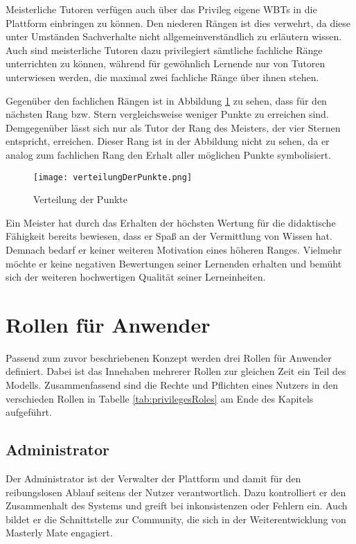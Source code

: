 Meisterliche Tutoren verfügen auch über das Privileg eigene WBTs in die
Plattform einbringen zu können. Den niederen Rängen ist dies verwehrt, da diese
unter Umständen Sachverhalte nicht allgemeinverständlich zu erläutern wissen.
Auch sind meisterliche Tutoren dazu privilegiert sämtliche fachliche Ränge
unterrichten zu können, während für gewöhnlich Lernende nur von Tutoren
unterwiesen werden, die maximal zwei fachliche Ränge über ihnen stehen.

Gegenüber den fachlichen Rängen ist in Abbildung \ref{ref:vertPunkt} zu sehen,
dass für den nächsten Rang bzw. Stern vergleichsweise weniger Punkte zu
erreichen sind. Demgegenüber lässt sich nur als Tutor der Rang des Meisters, der
vier Sternen entspricht, erreichen. Dieser Rang ist in der Abbildung nicht zu
sehen, da er analog zum fachlichen Rang den Erhalt aller möglichen Punkte
symbolisiert.
\begin{figure}[H] \texttt{[image: verteilungDerPunkte.png]}
\caption{Verteilung der Punkte}\label{ref:vertPunkt}
\end{figure}
Ein Meister hat durch das Erhalten der höchsten Wertung für die didaktische
Fähigkeit bereits bewiesen, dass er Spaß an der Vermittlung von Wissen hat.
Demnach bedarf er keiner weiteren Motivation eines höheren Ranges.
Vielmehr möchte er keine negativen Bewertungen seiner Lernenden erhalten und
bemüht sich der weiteren hochwertigen Qualität seiner Lerneinheiten.

\section{Rollen für Anwender}
Passend zum zuvor beschriebenen Konzept werden drei Rollen für Anwender
definiert. Dabei ist das Innehaben mehrerer Rollen zur gleichen Zeit ein Teil
des Modells. Zusammenfassend sind die Rechte und Pflichten eines Nutzers in den
verschieden Rollen in Tabelle \ref{tab:privilegesRoles} am Ende des
Kapitels aufgeführt.

\subsection{Administrator}
Der Administrator ist der Verwalter der Plattform und damit für den
reibungslosen Ablauf seitens der Nutzer verantwortlich. Dazu kontrolliert er den
Zusammenhalt des Systems und greift bei inkonsistenzen oder Fehlern ein. Auch
bildet er die Schnittstelle zur Community, die sich in der Weiterentwicklung von
Masterly Mate engagiert.

